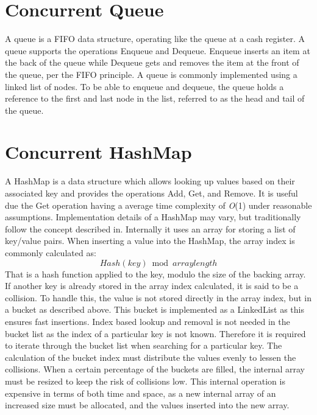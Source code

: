 \section{Concurrent Queue}\label{app:queue}
A queue is a \ac{FIFO} data structure, operating like the queue at a cash register\cite[p. 234]{cormen2009introduction}. A queue supports the operations Enqueue and Dequeue. Enqueue inserts an item at the back of the queue while Dequeue gets and removes the item at the front of the queue, per the \ac{FIFO} principle. A queue is commonly implemented using a linked list of nodes\cite[p. 234]{cormen2009introduction}. To be able to enqueue and dequeue, the queue holds a reference to the first and last node in the list, referred to as the head and tail of the queue.
 
\section{Concurrent HashMap}\label{app:hashmap}
A HashMap is a data structure which allows looking up values based on their associated key and provides the operations Add, Get, and Remove. It is useful due the Get operation having a average time complexity of \textit{O}(1) under reasonable assumptions\cite[p. 256]{cormen2009introduction}. Implementation details of a HashMap may vary, but traditionally follow the concept described in\cite[p. 256]{cormen2009introduction}. Internally it uses an array for storing a list of key/value pairs. When inserting a value into the HashMap, the  array index is commonly calculated as:
\begin{equation}
Hash(key) \bmod arraylength
\end{equation}
That is a hash function applied to the key, modulo the size of the backing array. If another key is already stored in the array index calculated, it is said to be a collision. To handle this, the value is not stored directly in the array index, but in a bucket as described above. This bucket is implemented as a LinkedList as this ensures fast insertions\cite[p. 257]{cormen2009introduction}. Index based lookup and removal is not needed in the bucket list as the index of a particular key is not known. Therefore it is required to iterate through the bucket list when searching for a particular key. The calculation of the bucket index must distribute the values evenly to lessen the collisions. When a certain percentage of the buckets are filled, the internal array must be resized to keep the risk of collisions low. This internal operation is expensive in terms of both time and space, as a new internal array of an increased size must be allocated, and the values inserted into the new array.


